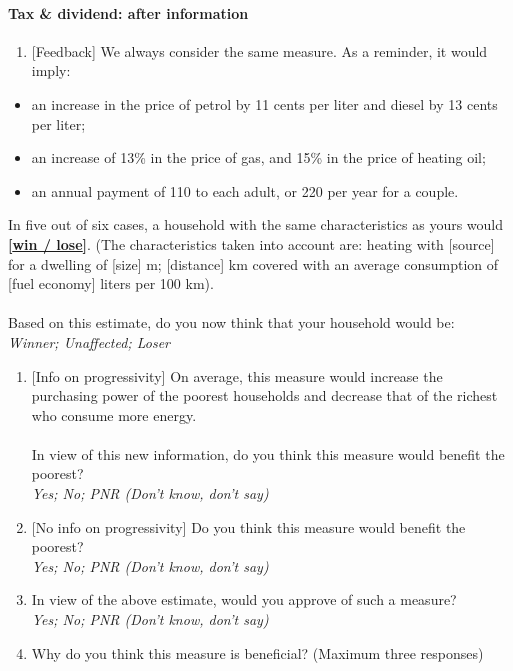 \documentclass[12pt]{article} %
\begin{document}
\begin{appendices}
\paragraph{Tax \& dividend: after information}
\begin{enumerate}[resume,leftmargin=*]
\item {[}Feedback{]} We always consider the same measure. As a reminder,
it would imply: 
\end{enumerate}
\begin{itemize}
\item an increase in the price of petrol by 11 cents per liter and diesel
by 13 cents per liter; 
\item an increase of 13\% in the price of gas, and 15\% in the price of
heating oil; 
\item an annual payment of 110\euros{} to each adult, or 220\euros{} per year for a couple. 
\end{itemize}
In five out of six cases, a household with the same characteristics
as yours would \textbf{\underline{{[}win / lose{]}}}. (The characteristics
taken into account are: heating with {[}source{]} for a dwelling of
{[}size{]} m\texttwosuperior ; {[}distance{]} km covered with an average
consumption of {[}fuel economy{]} liters per 100 km). \\
\\
Based on this estimate, do you now think that your household would
be: \emph{}\\
\emph{Winner; Unaffected; Loser} 
\begin{enumerate}[resume,leftmargin=*]
\item {[}Info on progressivity{]} On average, this measure would increase
the purchasing power of the poorest households and decrease that of the
richest who consume more energy. \\
\\
In view of this new information, do you think this measure would benefit
the poorest? \emph{}\\
\emph{Yes; No; PNR (Don't know, don't say)}
\item {[}No info on progressivity{]} Do you think this measure would benefit
the poorest?\\
\emph{Yes; No; PNR (Don't know, don't say)}
\item In view of the above estimate, would you approve of such a measure?
\emph{}\\
\emph{Yes; No; PNR (Don't know, don't say)} 
\item Why do you think this measure is beneficial? (Maximum three responses)

\end{enumerate}
\end{appendices}
\end{document}

